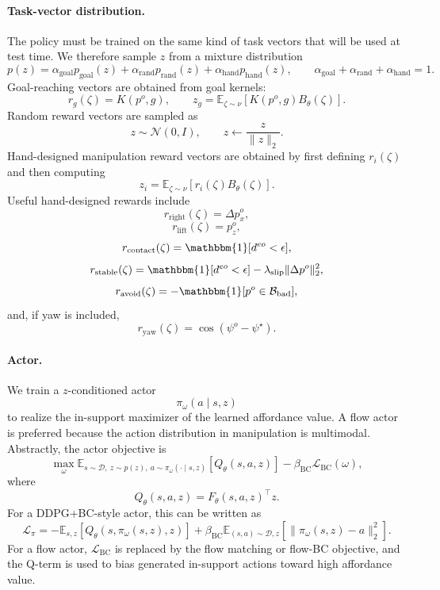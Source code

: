 \paragraph{Task-vector distribution.}
The policy must be trained on the same kind of task vectors that will be used at
test time.  We therefore sample \(z\) from a mixture distribution
\[
p(z)
=
\alpha_{\mathrm{goal}}p_{\mathrm{goal}}(z)
+
\alpha_{\mathrm{rand}}p_{\mathrm{rand}}(z)
+
\alpha_{\mathrm{hand}}p_{\mathrm{hand}}(z),
\qquad
\alpha_{\mathrm{goal}}+\alpha_{\mathrm{rand}}+\alpha_{\mathrm{hand}}=1.
\]
Goal-reaching vectors are obtained from goal kernels:
\[
r_g(\zeta)
=
K(p^o,g),
\qquad
z_g
=
\mathbb{E}_{\zeta\sim\nu}
\left[
K(p^o,g)B_\theta(\zeta)
\right].
\]
Random reward vectors are sampled as
\[
z\sim \mathcal{N}(0,I),
\qquad
z\leftarrow \frac{z}{\|z\|_2}.
\]
Hand-designed manipulation reward vectors are obtained by first defining
\(r_i(\zeta)\) and then computing
\[
z_i
=
\mathbb{E}_{\zeta\sim\nu}
\left[
r_i(\zeta)B_\theta(\zeta)
\right].
\]
Useful hand-designed rewards include
\[
r_{\mathrm{right}}(\zeta)=\Delta p_x^o,
\]
\[
r_{\mathrm{lift}}(\zeta)=p_z^o,
\]
\[
r_{\mathrm{contact}}(\zeta)=\mathbbm{1}[d^{eo}<\epsilon],
\]
\[
r_{\mathrm{stable}}(\zeta)
=
\mathbbm{1}[d^{eo}<\epsilon]
-
\lambda_{\mathrm{slip}}\|\Delta p^o\|_2^2,
\]
\[
r_{\mathrm{avoid}}(\zeta)
=
-\mathbbm{1}[p^o\in\mathcal{B}_{\mathrm{bad}}],
\]
and, if yaw is included,
\[
r_{\mathrm{yaw}}(\zeta)
=
\cos(\psi^o-\psi^\star).
\]

\paragraph{Actor.}
We train a \(z\)-conditioned actor
\[
\pi_\omega(a\mid s,z)
\]
to realize the in-support maximizer of the learned affordance value.  A flow actor is
preferred because the action distribution in manipulation is multimodal.  Abstractly,
the actor objective is
\[
\max_\omega
\mathbb{E}_{s\sim\mathcal{D},\ z\sim p(z),\ a\sim \pi_\omega(\cdot\mid s,z)}
\left[
Q_\theta(s,a,z)
\right]
-
\beta_{\mathrm{BC}}\mathcal{L}_{\mathrm{BC}}(\omega),
\]
where
\[
Q_\theta(s,a,z)=F_\theta(s,a,z)^\top z.
\]
For a DDPG+BC-style actor, this can be written as
\[
\mathcal{L}_{\pi}
=
-
\mathbb{E}_{s,z}
\left[
Q_\theta(s,\pi_\omega(s,z),z)
\right]
+
\beta_{\mathrm{BC}}
\mathbb{E}_{(s,a)\sim\mathcal{D},z}
\left[
\|\pi_\omega(s,z)-a\|_2^2
\right].
\]
For a flow actor, \(\mathcal{L}_{\mathrm{BC}}\) is replaced by the flow matching or
flow-BC objective, and the Q-term is used to bias generated in-support actions toward
high affordance value.

